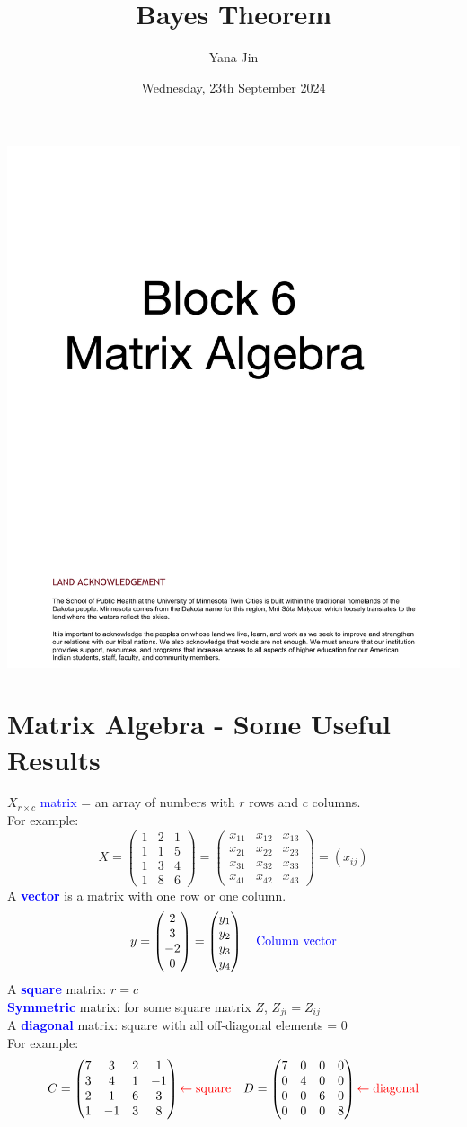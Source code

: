 \documentclass[14pt]{extarticle}
\title{Bayes Theorem}
\author{Yana Jin}
\date{Wednesday, 23th September 2024}
\newcommand{\coverpage}{%
    \begin{titlepage}
        \centering
        \includegraphics[width=1\textwidth]{cover.png}
    \end{titlepage}
}
\begin{document}
\coverpage

\newpage

\section*{Matrix Algebra - Some Useful Results}
\noindent
$X_{r \times c}$\textcolor{blue}{ matrix} = an array of numbers with $r$ rows and $c$ columns.\\
For example:
\[
X = \begin{pmatrix}
1 & 2 & 1 \\
1 & 1 & 5 \\
1 & 3 & 4 \\
1 & 8 & 6
\end{pmatrix}
=
\begin{pmatrix}
x_{11} & x_{12} & x_{13} \\
x_{21} & x_{22} & x_{23} \\
x_{31} & x_{32} & x_{33} \\
x_{41} & x_{42} & x_{43}
\end{pmatrix}
= (x_{ij})
\]
A \textbf{\textcolor{blue}{vector}} is a matrix with one row or one column.
\[
y = \begin{pmatrix}
2 \\
3 \\
-2 \\
0
\end{pmatrix}
=
\begin{pmatrix}
y_1 \\
y_2 \\
y_3 \\
y_4
\end{pmatrix}
\quad \textcolor{blue}{\text{Column vector}}
\]
A \textbf{\textcolor{blue}{square}} matrix: $r = c$ \\
\textcolor{blue}{\textbf{Symmetric}} matrix: for some square matrix $Z$, $Z_{ji} = Z_{ij}$ \\
A \textbf{\textcolor{blue}{diagonal}} matrix: square with all off-diagonal elements = 0 \\ 
For example:
\[
C = \begin{pmatrix}
7 & 3 & 2 & 1 \\
3 & 4 & 1 & -1 \\
2 & 1 & 6 & 3 \\
1 & -1 & 3 & 8
\end{pmatrix}
\textcolor{red}{\leftarrow \text{square}}
\quad
D = \begin{pmatrix}
7 & 0 & 0 & 0 \\
0 & 4 & 0 & 0 \\
0 & 0 & 6 & 0 \\
0 & 0 & 0 & 8
\end{pmatrix}
\textcolor{red}{\leftarrow \text{diagonal}}
\]
\end{document}
